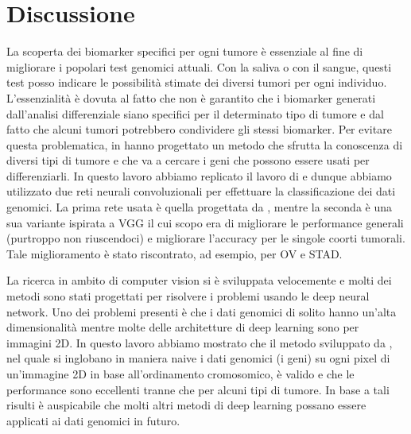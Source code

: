 \section{Discussione}
\label{sec:discussion}
La scoperta dei biomarker specifici per ogni tumore è essenziale al fine di migliorare i popolari
test genomici attuali. Con la saliva o con il sangue, questi test posso indicare le possibilità
stimate dei diversi tumori per ogni individuo. L'essenzialità è dovuta al fatto che non è garantito che
i biomarker generati dall'analisi differenziale siano specifici per il determinato tipo di tumore e
dal fatto che alcuni tumori potrebbero condividere gli stessi biomarker.
Per evitare questa problematica, in \cite{lyu2018deep} hanno progettato un metodo che sfrutta la conoscenza
di diversi tipi di tumore e che va a cercare i geni che possono essere usati per differenziarli.
In questo lavoro abbiamo replicato il lavoro di \cite{lyu2018deep} e dunque abbiamo utilizzato due reti
neurali convoluzionali per effettuare la classificazione dei dati genomici. La prima rete usata è quella
progettata da \cite{lyu2018deep}, mentre la seconda è una sua variante ispirata a VGG
\cite{simonyan2014very} il cui scopo era di migliorare le performance generali (purtroppo non riuscendoci) e 
migliorare l'accuracy per le singole coorti tumorali. Tale miglioramento è stato riscontrato, ad esempio, 
per OV e STAD.

La ricerca in ambito di computer vision si è sviluppata velocemente e molti dei metodi sono 
stati progettati per risolvere i problemi usando le deep neural network.
Uno dei problemi presenti è che i dati genomici di solito hanno un'alta dimensionalità mentre
molte delle architetture di deep learning sono per immagini 2D.
In questo lavoro abbiamo mostrato che il metodo sviluppato da \cite{lyu2018deep}, nel quale si
inglobano in maniera naive i dati genomici (i geni) su ogni pixel di un'immagine 2D in base 
all'ordinamento cromosomico, è valido e che le performance sono eccellenti tranne che per alcuni
tipi di tumore. 
In base a tali risulti è auspicabile che molti altri metodi di deep learning
possano essere applicati ai dati genomici in futuro.